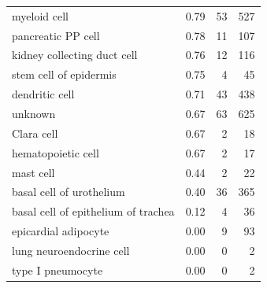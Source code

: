 \begin{table}[pht!]
\begin{tabular}{lrrr}
  myeloid cell & 0.79 &  53 & 527 \\ 
  pancreatic PP cell & 0.78 &  11 & 107 \\ 
  kidney collecting duct cell & 0.76 &  12 & 116 \\ 
  stem cell of epidermis & 0.75 &   4 &  45 \\ 
  dendritic cell & 0.71 &  43 & 438 \\ 
  unknown & 0.67 &  63 & 625 \\ 
  Clara cell & 0.67 &   2 &  18 \\ 
  hematopoietic cell & 0.67 &   2 &  17 \\ 
  mast cell & 0.44 &   2 &  22 \\ 
  basal cell of urothelium & 0.40 &  36 & 365 \\ 
  basal cell of epithelium of trachea & 0.12 &   4 &  36 \\ 
  epicardial adipocyte & 0.00 &   9 &  93 \\ 
  lung neuroendocrine cell & 0.00 &   0 &   2 \\ 
  type I pneumocyte & 0.00 &   0 &   2 \\ 
   \bottomrule
\end{tabular}
\end{table}

